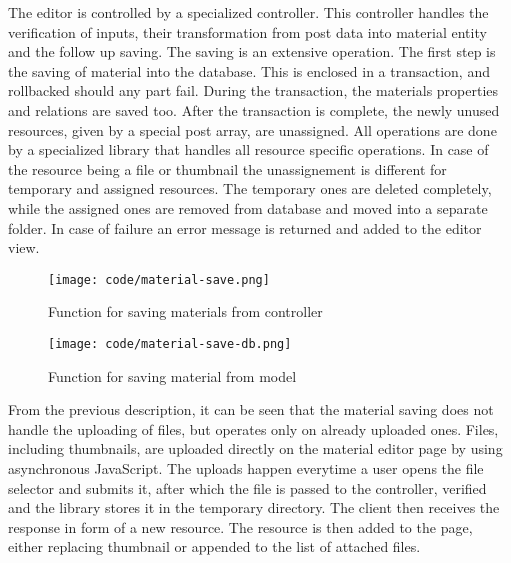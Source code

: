 \documentclass[
  digital,     %
  oneside,     %
  nosansbold,  %
  colorbold, %
  lof,         %
  lot,         %
]{fithesis4}
\begin{document}
The editor is controlled by a specialized controller. This controller handles the verification of inputs, their transformation from post data into material entity and the follow up saving. The saving is an extensive operation. The first step is the saving of material into the database. This is enclosed in a transaction, and rollbacked should any part fail. During the transaction, the materials properties and relations are saved too. After the transaction is complete, the newly unused resources, given by a special post array, are unassigned. All operations are done by a specialized library that handles all resource specific operations. In case of the resource being a file or thumbnail the unassignement is different for temporary and assigned resources. The temporary ones are deleted completely, while the assigned ones are removed from database and moved into a separate folder. In case of failure an error message is returned and added to the editor view.

\begin{figure}[!htbp]
	\begin{center}
		\begin{minipage}{.9\textwidth}
			\texttt{[image: code/material-save.png]}
		\end{minipage}
	\end{center}
	\caption{Function for saving materials from controller}
	\label{fig:material-save}
\end{figure}

\begin{figure}[!htbp]
	\begin{center}
		\begin{minipage}{.8\textwidth}
			\texttt{[image: code/material-save-db.png]}
		\end{minipage}
	\end{center}
	\caption{Function for saving material from model}
	\label{fig:material-save-db}
\end{figure}

From the previous description, it can be seen that the material saving does not handle the uploading of files, but operates only on already uploaded ones. Files, including thumbnails, are uploaded directly on the material editor page by using asynchronous JavaScript. The uploads happen everytime a user opens the file selector and submits it, after which the file is passed to the controller, verified and the library stores it in the temporary directory. The client then receives the response in form of a new resource. The resource is then added to the page, either replacing thumbnail or appended to the list of attached files.
\end{document}
